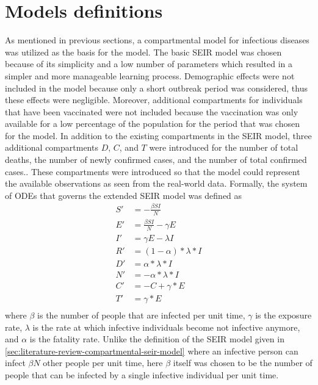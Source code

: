 \section{Models definitions}
\label{sec:methodologies-models-definitions}

As mentioned in previous sections, a compartmental model for infectious diseases was utilized as the basis for the model.
The basic \gls{SEIR} model was chosen because of its simplicity and a low number of parameters which resulted in a simpler and more manageable learning process.
Demographic effects were not included in the model because only a short outbreak period was considered, thus these effects were negligible.
Moreover, additional compartments for individuals that have been vaccinated were not included because the vaccination was only available for a low percentage of the population for the period that was chosen for the model.
In addition to the existing compartments in the \gls{SEIR} model, three additional compartments $D$, $C$, and $T$ were introduced for the number of total deaths, the number of newly confirmed cases, and the number of total confirmed cases..
These compartments were introduced so that the model could represent the available observations as seen from the real-world data.
Formally, the system of \glspl{ODE} that governs the extended \gls{SEIR} model was defined as
\begin{equation}
    \begin{aligned}
        S' &= - \frac{\beta SI}{N} \\
        E' &= \frac{\beta SI}{N} - \gamma E \\
        I' &= \gamma E - \lambda I \\
        R' &= (1 - \alpha) * \lambda * I \\
        D' &= \alpha * \lambda * I \\
        N' &= - \alpha * \lambda * I \\
        C' &= -C + \gamma * E \\
        T' &= \gamma * E \\
    \end{aligned}
    \label{eq:methodologies-seir-model}
\end{equation}
where $\beta$ is the number of people that are infected per unit time, $\gamma$ is the exposure rate, $\lambda$ is the rate at which infective individuals become not infective anymore, and $\alpha$ is the fatality rate.
Unlike the definition of the \gls{SEIR} model given in \autoref{sec:literature-review-compartmental-seir-model} where an infective person can infect $\beta N$ other people per unit time, here $\beta$ itself was chosen to be the number of people that can be infected by a single infective individual per unit time.
